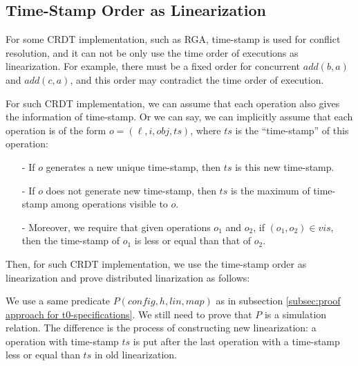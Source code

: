 \subsection{Time-Stamp Order as Linearization}
\label{subsec:time-stamp order as linearizabtion}  

For some CRDT implementation, such as RGA, time-stamp is used for conflict resolution, and it can not be only use the time order of executions as linearization. For example, there must be a fixed order for concurrent $\mathit{add}(b,a)$ and $\mathit{add}(c,a)$, and this order may contradict the time order of execution. 

For such CRDT implementation, we can assume that each operation also gives the information of time-stamp. Or we can say, we can implicitly assume that each operation is of the form $o = (\ell,i,\mathit{obj},\mathit{ts})$, where $\mathit{ts}$ is the ``time-stamp'' of this operation: 

\begin{itemize}
\setlength{\itemsep}{0.5pt}
\item[-] If $o$ generates a new unique time-stamp, then $\mathit{ts}$ is this new time-stamp.

\item[-] If $o$ does not generate new time-stamp, then $\mathit{ts}$ is the maximum of time-stamp among operations visible to $o$.

\item[-] Moreover, we require that given operations $o_1$ and $o_2$, if $(o_1,o_2) \in \mathit{vis}$, then the time-stamp of $o_1$ is less or equal than that of $o_2$.
\end{itemize}

Then, for such CRDT implementation, we use the time-stamp order as linearization and prove distributed linarization as follows: 

We use a same predicate $P(\mathit{config},h,\mathit{lin},\mathit{map})$ as in subsection \ref{subsec:proof approach for t0-specifications}. We still need to prove that $P$ is a simulation relation. The difference is the process of constructing new linearization: a operation with time-stamp $\mathit{ts}$ is put after the last operation with a time-stamp less or equal than $\mathit{ts}$ in old linearization.

